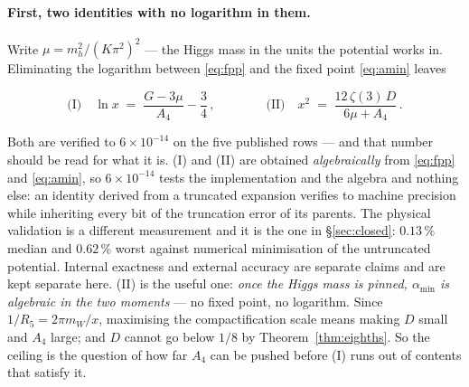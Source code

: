 \documentclass[11pt,a4paper]{article}
\newcommand{\amin}{\alpha_{\min}}
\newenvironment{keyeq}
  {\begin{center}\setlength{\fboxsep}{9pt}\setlength{\fboxrule}{0.8pt}%
   \begin{lrbox}{\keyeqbox}\begin{minipage}{0.88\textwidth}}
  {\end{minipage}\end{lrbox}%
   \fcolorbox{hdrblue!55}{hdrblue!6}{\usebox{\keyeqbox}}\end{center}}
\begin{document}
\paragraph{First, two identities with no logarithm in them.} Write
$\mu = m_h^2/(K\pi^2)^2$ --- the Higgs mass in the units the potential works in. Eliminating the
logarithm between \eqref{eq:fpp} and the fixed point \eqref{eq:amin} leaves
\begin{keyeq}
\begin{equation}\label{eq:two}
  \text{(I)}\quad \ln x \;=\; \frac{G-3\mu}{A_4}-\frac34\,,
  \qquad\qquad
  \text{(II)}\quad x^2 \;=\; \frac{12\,\zeta(3)\,D}{6\mu+A_4}\,.
\end{equation}
\end{keyeq}
\noindent Both are verified to $6\times10^{-14}$ on the five published rows --- and that number
should be read for what it is. (I) and (II) are obtained \emph{algebraically} from
\eqref{eq:fpp} and \eqref{eq:amin}, so $6\times10^{-14}$ tests the implementation and the algebra
and nothing else: an identity derived from a truncated expansion verifies to machine precision
while inheriting every bit of the truncation error of its parents. The physical validation is a
different measurement and it is the one in \S\ref{sec:closed}: $0.13\,\%$ median and $0.62\,\%$
worst against numerical minimisation of the untruncated potential. Internal exactness and external
accuracy are separate claims and are kept separate here. (II) is the useful one:
\emph{once the Higgs mass is pinned, $\amin$ is algebraic in the two moments} --- no fixed point, no
logarithm. Since $1/R_5=2\pi m_W/x$, maximising the compactification scale means making $D$ small
and $A_4$ large; and $D$ cannot go below $1/8$ by Theorem~\ref{thm:eighths}. So the ceiling is the
question of how far $A_4$ can be pushed before (I) runs out of contents that satisfy it.
\end{document}

